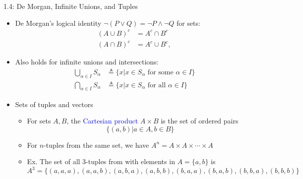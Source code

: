 \documentclass[10pt,english]{beamer}
\begin{document}
\begin{frame}{1.4: De Morgan, Infinite Unions, and Tuples}

\begin{itemize}
\setlength\itemsep{3mm}
\item<1-> De Morgan's logical identity $\neg (P \vee Q) = \neg P \wedge \neg Q$ for sets:
\begin{align*}
(A \cup B)^c & = A^c \cap B^c \\
(A \cap B)^c & = A^c \cup B^c,
\end{align*}

\item<2-> Also holds for infinite unions and intersections:
  \begin{align*}
  \bigcup_{\alpha \in I} S_{\alpha}
  &\triangleq \{ x | x \in S_{\alpha} \text{ for some } \alpha \in I \} \\
  \bigcap_{\alpha \in I} S_{\alpha}
  &\triangleq \{ x | x \in S_{\alpha} \text{ for all } \alpha \in I \} 
  \end{align*}  

\item<3-> Sets of tuples and vectors \vspace{1mm}
\begin{itemize}
  \setlength\itemsep{1.5mm}
  \item For sets $A,B$, the \textcolor{blue}{Cartesian product} $A\times B$ is the set of ordered pairs \[\{(a,b) | a\in A, b\in B\}\]
  \item For $n$-tuples from the same set, we have $A^n=A\times A \times \cdots \times A$
  \item Ex. The set of all 3-tuples from with elements in $A  = \{ a,b \}$ is
\begin{equation*}
\!\!\!\!\!\!\!\!\!\!\!\!\!\!\!\!\!\!\! A^3 = \{ (a,a,a),(a,a,b),(a,b,a),(a,b,b),(b,a,a),(b,a,b),(b,b,a),(b,b,b) \}
\end{equation*}
\end{itemize}
  
\end{itemize}
\end{frame}
\end{document}
